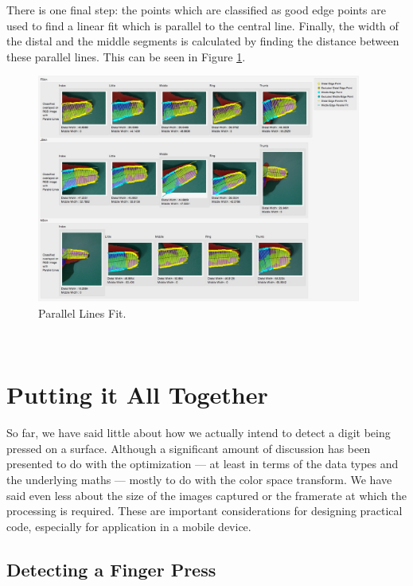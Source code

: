 There is one final step: the points which are classified as good edge points are used to find a linear fit which is parallel to the central line. Finally, the width of the distal and the middle segments is calculated by finding the distance between these parallel lines. This can be seen in Figure \ref{fig:ParallelFit}.

\begin{figure}[h!]
  \centering
    \includegraphics[width=0.95\textwidth]{Chapter4/Figs/ParallelFit.jpg}
    \caption{Parallel Lines Fit.}\label{fig:ParallelFit}
\end{figure}



\

\section{Putting it All Together}\label{sec:PuttingItAllTogether}

So far, we have said little about how we actually intend to detect a digit being pressed on a surface. Although a significant amount of discussion has been presented to do with the optimization --- at least in terms of the data types and the underlying maths --- mostly to do with the color space transform. We have said even less about the size of the images captured or the framerate at which the processing is required. These are important considerations for designing practical code, especially for application in a mobile device.

\subsection{Detecting a Finger Press}\label{sec:DetectingAFingerPress}

